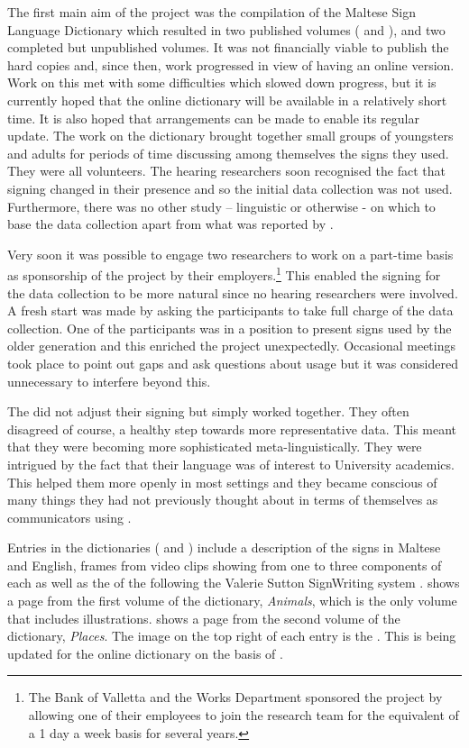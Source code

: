 \documentclass[output=paper]{langsci/langscibook}
\begin{document}
The first main aim of the project was the compilation of the Maltese
Sign Language Dictionary which resulted in two published volumes
(\citealt{a03} and \citealt{a04}), and two completed but
unpublished volumes.  It was not financially viable to publish the
hard copies and, since then, work progressed in view of having an
online version.  Work on this met with some difficulties which slowed
down progress, but it is currently hoped that the online dictionary
will be available in a relatively short time.  It is also hoped that
arrangements can be made to enable its regular update. The work on the
dictionary brought together small groups of  youngsters and adults
for periods of time discussing among themselves the signs they used.
They were all volunteers.  The hearing researchers soon recognised the
fact that signing changed in their presence and so the initial data
collection was not used.  Furthermore, there was no other study –
linguistic or otherwise - on which to base the data collection apart
from what was reported by \citet{lj86}.

Very soon it was possible to engage two  researchers to work on a
part-time basis as sponsorship of the project by their
employers.\footnote{The Bank of Valletta and the Works Department
  sponsored the project by allowing one of their employees to join the
  research team for the equivalent of a 1 day a week basis for several
  years.}  This enabled the signing for the data collection to be
more natural since no hearing researchers were involved.  A fresh
start was made by asking the  participants to take full charge of
the data collection.  One of the participants was in a position to
present signs used by the older generation and this enriched the
project unexpectedly. Occasional meetings took place to point out gaps
and ask questions about usage but it was considered unnecessary to
interfere beyond this.

The  did not adjust their signing but simply worked together.
They often disagreed of course, a healthy step towards more
representative data.  This meant that they were becoming more
sophisticated meta-linguistically.  They were intrigued by the fact
that their language was of interest to University academics.  This
helped them  more openly in most settings and they became
conscious of many things they had not previously thought about in
terms of themselves as communicators using .

Entries in the  dictionaries
(\citealt{a03} and \citealt{a04}) include a description of
the signs in Maltese and English, frames from video clips showing from one to
three components of each  as well as the  of the
 following the Valerie Sutton SignWriting system
\citep{s95}.  shows a page from the first
volume of the dictionary, {\em Animals}, which is the only volume that
includes illustrations.   shows a page from the
second volume of the dictionary, {\em Places}.  The image on the top right
of each entry is the . This is being updated for the online dictionary on the basis of \citet{g14}. 
\end{document}
